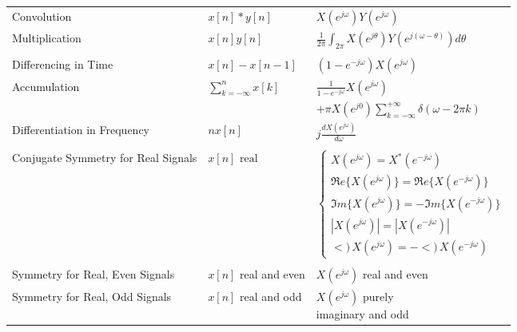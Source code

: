 \documentclass[12pt]{article}
\numberwithin{equation}{section}
\newcommand{\phase}{\mbox{$<\!\!\!)\,$}}
\begin{document}
\begin{table}[htb]
\begin{center}
\begin{tabular}{p{2.0in}ll}
   Convolution
  & $\displaystyle x[n]*y[n]$
  & $\displaystyle X(e^{j\omega}) Y(e^{j\omega})$ \\
   Multiplication
  & $\displaystyle x[n] y[n]$
  & $\displaystyle \frac{1}{2\pi} \int_{2\pi} X(e^{j\theta})
    Y(e^{j(\omega-\theta)}) d\theta$ \\
& & \\
   Differencing in Time
  & $\displaystyle x[n]-x[n-1]$
  & $\displaystyle(1-e^{-j\omega}) X(e^{j\omega})$ \\
   Accumulation
  & $\displaystyle \sum^{n}_{k=-\infty} x[k]$
  & $\displaystyle \frac{1}{1-e^{-j\omega}} X(e^{j\omega})$ \\
  & & $\displaystyle + \pi X(e^{j0}) \sum^{+\infty}_{k=-\infty} \delta(\omega-2\pi k)$ \\
   Differentiation in Frequency
  & $\displaystyle nx[n]$
  & $\displaystyle j \frac{dX(e^{j\omega})}{d\omega}$ \\
& & \\

   Conjugate  Symmetry for Real Signals
  & $\displaystyle x[n] \mbox{\ real}$
  & $\displaystyle \!\!\!\!\left\{ \!\!\!\!
    \begin{array}{l}
      X(e^{j\omega}) = X^{*}(e^{-j\omega}) \\
      \Re e\{X(e^{j\omega})\}=\Re e\{X(e^{-j\omega})\} \\
      \Im m\{X(e^{j\omega})\}=-\Im m \{X(e^{-j\omega})\} \\
      |X(e^{j\omega})|=|X(e^{-j\omega})| \\
      \phase X(e^{j\omega}) =-\phase X(e^{-j\omega})
  \end{array}\right.$ \\
& & \\

   Symmetry for Real, Even Signals & $x[n]$ real and even
  & $X(e^{j\omega})$ real and even\\

   Symmetry for Real, Odd Signals & $x[n]$ real and odd
  & \parbox{1.5in}{$X(e^{j\omega})$ purely \\ imaginary and odd} \\


\end{tabular}
\end{center}
\end{table}
\end{document}
